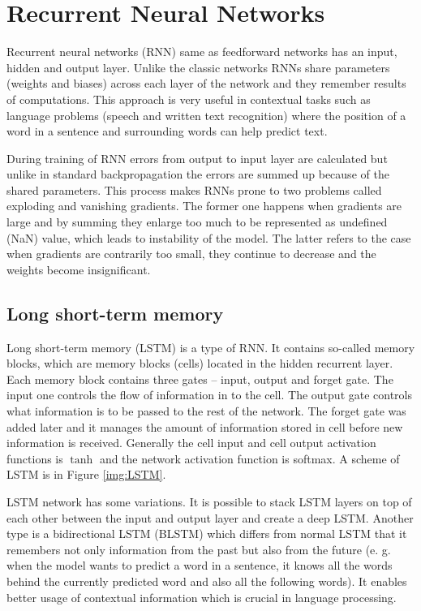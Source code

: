 \section{Recurrent Neural Networks}
\label{sec:RNN}

Recurrent neural networks (RNN) same as feedforward networks has an input, hidden and output layer. Unlike the classic networks RNNs share parameters (weights and biases) across each layer of the network and they remember results of computations. This approach is very useful in contextual tasks such as language problems (speech and written text recognition) where the position of a word in a sentence and surrounding words can help predict text.

During training of RNN errors from output to input layer are calculated but unlike in standard backpropagation the errors are summed up because of the shared parameters. This process makes RNNs prone to two problems called exploding and vanishing gradients. The former one happens when gradients are large and by summing they enlarge too much to be represented as undefined (NaN) value, which leads to instability of the model. The latter refers to the case when gradients are contrarily too small, they continue to decrease and the weights become insignificant.\cite{rnn}

\subsection*{Long short-term memory}
\label{sec:LSTM}

Long short-term memory (LSTM) is a type of RNN. It contains so-called memory blocks, which are memory blocks (cells) located in the hidden recurrent layer. Each memory block contains three gates -- input, output and forget gate. The input one controls the flow of information in to the cell. The output gate controls what information is to be passed to the rest of the network. The forget gate was added later and it manages the amount of information stored in cell before new information is received. Generally the cell input and cell output activation functions is $\tanh$ and the network activation function is softmax. A scheme of LSTM is in Figure \ref*{img:LSTM}.\cite{lstm}

LSTM network has some variations. It is possible to stack LSTM layers on top of each other between the input and output layer and create a deep LSTM. Another type is a bidirectional LSTM (BLSTM) which differs from normal LSTM that it remembers not only information from the past but also from the future (e. g. when the model wants to predict a word in a sentence, it knows all the words behind the currently predicted word and also all the following words). It enables better usage of contextual information which is crucial in language processing.\cite{lstm,baueldungLSTM}


